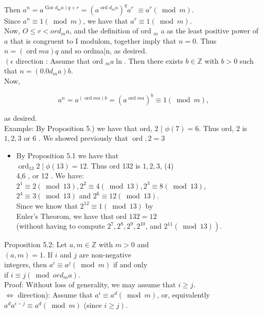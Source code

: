 \documentclass[10pt]{article}
\begin{document}
Then $a^{n}=a^{\left.\operatorname{Gor} d_{m} a\right) q+r}=\left(a^{\operatorname{ord} d_{m} a}\right)^{q} a^{r}$ $\equiv a^{r}(\bmod m)$.\\
Since $a^{n} \equiv 1(\bmod m)$, we have that $a^{r} \equiv 1(\bmod m)$.\\
Now, $O \leqslant r<o r d_{m} a$, and the definition of ord ${ }_{m}$ a as the least positive power of $a$ that is congruent to I modulom, together imply that $n=0$. Thus $n=(\operatorname{ord} m a) q$ and so ordma|n, as desired.\\
$\left(\epsilon\right.$ direction : Assume that ord ${ }_{m} a \ln$. Then there exists $b \in \mathbb{Z}$ with $b>0$ such that $n=\left(0.0 d_{m} a\right) b$.\\
Now,

$$
a^{n}=a^{(\operatorname{ord} m a) b}=\left(a^{\operatorname{ord} m a}\right)^{b} \equiv 1(\bmod m),
$$

as desired.\\
Example: By Proposition 5.) we have that ord, 2 | $\phi(7)=6$. Thus ord, 2 is $1,2,3$ or 6 . We showed previously that $\operatorname{ord}, 2=3$

\begin{itemize}
  \item By Proposition 5.1 we have that\\
$\operatorname{ord}_{13} 2 \mid \phi(13)=12$. Thus ord 132 is $1,2,3$, (4)\\
4,6 , or 12 . We have:\\
$2^{1} \equiv 2(\bmod 13), 2^{2} \equiv 4(\bmod 13), 2^{3} \equiv 8(\bmod 13)$,\\
$2^{4} \equiv 3(\bmod 13)$ and $2^{6} \equiv 12(\bmod 13)$.\\
Since we know that $2^{12} \equiv 1(\bmod 13)$ by\\
Euler's Theorom, we have that ord $132=12$\\
(without having to compute $2^{7}, 2^{8}, 2^{9}, 2^{10}$, and $\left.2^{11}(\bmod 13)\right)$.
\end{itemize}

Proposition 5.2: Let $a, m \in \mathbb{Z}$ with $m>0$ and\\
$(a, m)=1$. If $i$ and $j$ are non-negative\\
integers, then $a^{i} \equiv a^{j}(\bmod m)$ if and only\\
if $i \equiv j\left(\bmod o r d_{m} a\right)$.\\
Proof: Without loss of generality, we may assume that $i \geqslant j$.\\
$\Leftrightarrow$ direction): Assume that $a^{i} \equiv a^{d}(\bmod m)$, or, equivalently $a^{\dot{d}} a^{i-j} \equiv a^{\dot{d}}(\bmod m)$ (since $\left.i \geqslant j\right)$.
\end{document}
